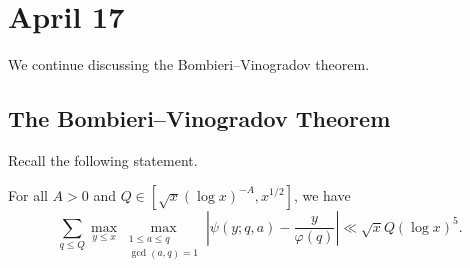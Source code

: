 \documentclass[../notes.tex]{subfiles}
\begin{document}
\section{April 17}

We continue discussing the Bombieri--Vinogradov theorem.

\subsection{The Bombieri--Vinogradov Theorem}
Recall the following statement.
\begin{theorem}
	For all $A>0$ and $Q\in\left[\sqrt x(\log x)^{-A},x^{1/2}\right]$, we have
	\[\sum_{q\le Q}\max_{y\le x}\max_{\substack{1\le a\le q\\\gcd(a,q)=1}}\left|\psi(y;q,a)-\frac y{\varphi(q)}\right|\ll\sqrt xQ(\log x)^5.\]
\end{theorem}
\end{document}
